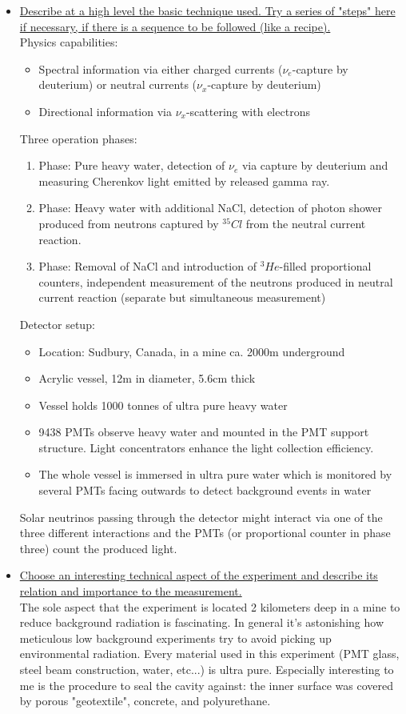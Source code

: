 \documentclass[12pt]{article}
\begin{document}
\begin{itemize}
		\item \ul{Describe at a high level the basic technique used. Try a series of "steps" here if necessary, if there is a sequence to be followed (like a recipe).} \\
		\noindent
		Physics capabilities:
		\begin{itemize}
			\item Spectral information via either charged currents ($\nu_e$-capture by deuterium) or neutral currents ($\nu_x$-capture by deuterium)
			\item Directional information via $\nu_x$-scattering with electrons
		\end{itemize}
		\noindent
		Three operation phases:
		\begin{enumerate}
			\item Phase: Pure heavy water, detection of $\nu_e$ via capture by deuterium and measuring Cherenkov light emitted by released gamma ray.
			\item Phase: Heavy water with additional NaCl, detection of photon shower produced from neutrons captured by $^{35}Cl$ from the neutral current reaction.
			\item Phase: Removal of NaCl and introduction of $^3He$-filled proportional counters, independent measurement of the neutrons produced in neutral current reaction (separate but simultaneous measurement)
		\end{enumerate}
		\noindent
		Detector setup:
		\begin{itemize}
			\item Location: Sudbury, Canada, in a mine ca. 2000m underground
			\item Acrylic vessel, 12m in diameter, 5.6cm thick
			\item Vessel holds 1000 tonnes of ultra pure heavy water
			\item 9438 PMTs observe heavy water and mounted in the PMT support structure. Light concentrators enhance the light collection efficiency. 
			\item The whole vessel is immersed in ultra pure water which is monitored by several PMTs facing outwards to detect background events in water
		\end{itemize}
		\noindent Solar neutrinos passing through the detector might interact via one of the three different interactions and the PMTs (or proportional counter in phase three) count the produced light. 
		
		\item \ul{Choose an interesting technical aspect of the experiment and describe its relation and importance to the measurement.} \\
		\noindent
		The sole aspect that the experiment is located 2 kilometers deep in a mine to reduce background radiation is fascinating. In general it's astonishing how meticulous low background experiments try to avoid picking up environmental radiation. Every material used in this experiment (PMT glass, steel beam construction, water, etc...) is ultra pure. Especially interesting to me is the procedure to seal the cavity against: the inner surface was covered by porous "geotextile", concrete, and polyurethane. 


\end{itemize}
\end{document}
